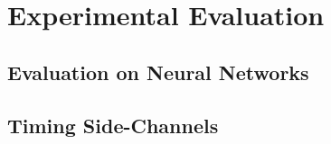 \chapter{Experimental Evaluation}


\section{Evaluation on Neural Networks}

\section{Timing Side-Channels}
